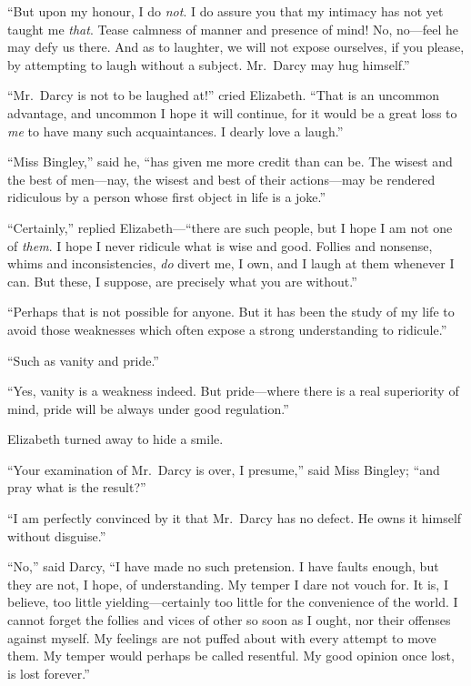 ``But upon my honour, I do \emph{not}.  I do assure you that my
intimacy has not yet taught me \emph{that}.  Tease calmness of
manner and presence of mind!  No, no---feel he may defy us
there.  And as to laughter, we will not expose ourselves, if you
please, by attempting to laugh without a subject.  Mr.\ Darcy may
hug himself.''

``Mr.\ Darcy is not to be laughed at!'' cried Elizabeth.  ``That is
an uncommon advantage, and uncommon I hope it will continue, for
it would be a great loss to \emph{me} to have many such acquaintances.
I dearly love a laugh.''

``Miss Bingley,'' said he, ``has given me more credit than can be.
The wisest and the best of men---nay, the wisest and best of their
actions---may be rendered ridiculous by a person whose first
object in life is a joke.''

``Certainly,'' replied Elizabeth---``there are such people, but I
hope I am not one of \emph{them}.  I hope I never ridicule what is
wise and good.  Follies and nonsense, whims and
inconsistencies, \emph{do} divert me, I own, and I laugh at them
whenever I can.  But these, I suppose, are precisely what you
are without.''

``Perhaps that is not possible for anyone.  But it has been the
study of my life to avoid those weaknesses which often expose a
strong understanding to ridicule.''

``Such as vanity and pride.''

``Yes, vanity is a weakness indeed.  But pride---where there is a
real superiority of mind, pride will be always under good
regulation.''

Elizabeth turned away to hide a smile.

``Your examination of Mr.\ Darcy is over, I presume,'' said Miss
Bingley; ``and pray what is the result?''

``I am perfectly convinced by it that Mr.\ Darcy has no defect.
He owns it himself without disguise.''

``No,'' said Darcy, ``I have made no such pretension.  I have
faults enough, but they are not, I hope, of understanding.
My temper I dare not vouch for.  It is, I believe, too little
yielding---certainly too little for the convenience of the world.
I cannot forget the follies and vices of other so soon as I ought,
nor their offenses against myself.  My feelings are not puffed
about with every attempt to move them.  My temper would perhaps be
called resentful.  My good opinion once lost, is lost forever.''

